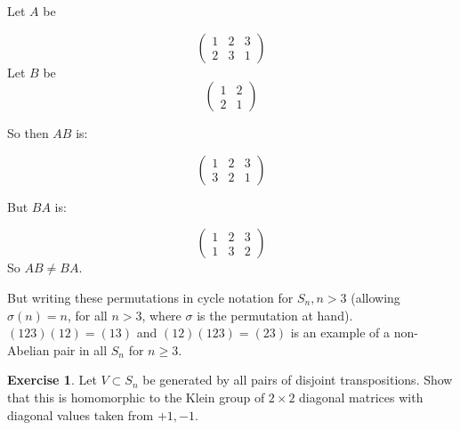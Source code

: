 \documentclass[11pt,oneside]{article}
\numberwithin{equation}{section}
\theoremstyle{definition}
\newtheorem{exercise}{Exercise}
\begin{document}
\begin{solution}
  Let $A$ be 
  
  $$ 
  \begin{pmatrix}
    1 & 2 & 3 \\
    2 & 3 & 1 
  \end{pmatrix}
  $$
  Let $B$ be 
  $$
  \begin{pmatrix}
    1 & 2 \\
    2 & 1
  \end{pmatrix}
  $$

  So then $ A B $ is:
  
  $$
  \begin{pmatrix}
    1 & 2 & 3 \\
    3 & 2 & 1 
  \end{pmatrix}
  $$
  
  But $ B A $ is:
  
  $$
  \begin{pmatrix}
    1 & 2 & 3 \\
    1 & 3 & 2
  \end{pmatrix}
  $$
  So $A B \neq B A$.
  
  But writing these permutations in cycle notation for $S_n, n > 3$ (allowing
  $\sigma(n) = n$, for all $n > 3$, where $\sigma$ is the permutation
  at hand).  $ (1 2 3) ( 1 2 ) = ( 1 3) $ and $ ( 1 2 ) ( 1 2 3) = ( 2
  3) $ is an example of a non-Abelian pair in all $S_n$ for $n \geq
  3$.
\end{solution}
\begin{exercise}
  Let $V \subset S _n$ be generated by all pairs of disjoint
  transpositions. Show that this is homomorphic to the Klein group of
  $2 \times 2$ diagonal matrices with diagonal values taken from
  $+1, -1$.
\end{exercise}
\end{document}
